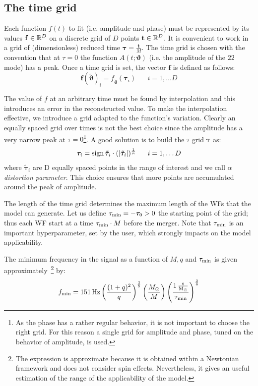 \subsection{The time grid}
Each function $f(t)$ to fit (i.e. amplitude and phase) must be represented by its values $\mathbf{f} \in \mathbb{R}^D$ on a discrete grid of $D$ points $\mathbf{t} \in \mathbb{R}^D$.
It is convenient to work in a grid of (dimensionless) reduced time $\boldsymbol{\tau} = \frac{\mathbf{t}}{M}$.
The time grid is chosen with the convention that at $\tau=0$ the function $A(t;\boldsymbol{\vartheta})$ (i.e. the amplitude of the ${22}$ mode) has a peak.
Once a time grid is set, the vector $\mathbf{f}$ is defined as follows:
\begin{equation}
	\mathbf{f}({\tilde{\boldsymbol{\vartheta}}})_i = f_{{\tilde{\boldsymbol{\vartheta}}}}(\boldsymbol{\tau}_i) \;\;\;\;\;\; i = 1, \ldots D
\end{equation}

The value of $f$ at an arbitrary time must be found by interpolation and this introduces an error in the reconstructed value.
To make the interpolation effective, we introduce a grid adapted to the
  function's variation.
Clearly an equally spaced grid over times is not the best choice since the amplitude has a very narrow peak at $\tau=0$\footnote{As the phase has a rather regular behavior, it is not important to choose the right grid. For this reason a single grid for amplitude and phase, tuned on the behavior of amplitude, is used.}.
A good solution is to build the $\tau$ grid ${\boldsymbol{\tau}}$ as:
\begin{equation} \label{eq:tau_grid}
	{\boldsymbol{\tau}}_i = \operatorname{sign}{\boldsymbol{\tilde{\tau}}_i} \cdot (|\boldsymbol{\tilde{\tau}}_i|)^{\frac{1}{\alpha}} \;\;\;\;\;\; i = 1, \ldots D
\end{equation}
where $\boldsymbol{\tilde{\tau}}_i$ are D equally spaced points in the range of interest and we call $\alpha$ \textit{distortion parameter}.
This choice ensures that more points are accumulated around the peak of amplitude.

The length of the time grid determines the maximum length of the WFs that the model can generate.
Let us define $\tau_{\rm min} = -{\boldsymbol{\tau}}_0 > 0 $ the starting point of the grid; thus each WF start 
at a time $\tau_{\rm min}\cdot M$ before the merger. Note that $\tau_{\rm min}$ is an important hyperparameter, 
set by the user, which strongly impacts on the model applicability.

The minimum frequency in the signal as a function of $M, q$ and $\tau_{\rm min}$ is given 
approximately~\footnote{The expression is approximate because it is obtained within a Newtonian framework and does not consider spin effects.
Nevertheless, it gives an useful estimation of the range of the applicability of the model.}
by:
\begin{align}\label{eq:f_min}
	f_{\rm min} = \SI{151}{Hz}  \left( \frac{(1+q)^2}{q} \right)^{\frac{3}{8}}  \left( \frac{M_\odot}{M} \right)  \left(\frac{\SI{1}{ \frac{s}{M_\odot}}}{\tau_{\rm min}} \right)^{\frac{3}{8}}  
\end{align} 


